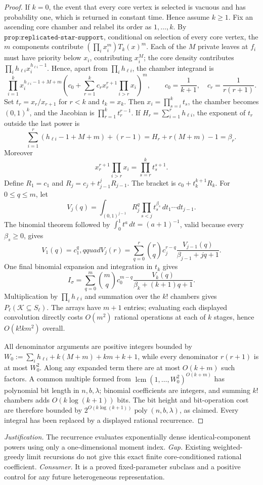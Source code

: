 \documentclass{article}
\begin{document}
\begin{proof}
If \(k=0\), the event that every core vertex is selected is vacuous and has probability one, which is returned in constant time.  Hence assume \(k\ge1\).  Fix an ascending core chamber and relabel its order as \(1,\ldots,k\).  By \(\texttt{prop:replicated-star-support}\), conditional on selection of every core vertex, the \(m\) components contribute \((\prod_i x_i^m)T_k(x)^m\).  Each of the \(M\) private leaves at \(f_i\) must have priority below \(x_i\), contributing \(x_i^M\); the core density contributes \(\prod_i h_{\ell i}x_i^{h_{\ell i}-1}\).  Hence, apart from \(\prod_i h_{\ell i}\), the chamber integrand is
\[
 \prod_{i=1}^kx_i^{h_{\ell i}-1+M+m}
 \left(c_0+\sum_{r=1}^kc_r x_r^{r+1}\prod_{i>r}x_i\right)^m,
 \qquad c_0=\frac1{k+1},\quad c_r=\frac1{r(r+1)}.
\]
Set \(t_r=x_r/x_{r+1}\) for \(r<k\) and \(t_k=x_k\).  Then \(x_i=\prod_{s=i}^kt_s\), the chamber becomes \((0,1)^k\), and the Jacobian is \(\prod_{r=1}^kt_r^{r-1}\).  If \(H_r=\sum_{i=1}^rh_{\ell i}\), the exponent of \(t_r\) outside the last power is
\[
 \sum_{i=1}^r(h_{\ell i}-1+M+m)+(r-1)=H_r+r(M+m)-1=\beta_r.
\]
Moreover
\[
 x_r^{r+1}\prod_{i>r}x_i=\prod_{s=r}^kt_s^{s+1}.
\]
Define \(R_1=c_1\) and \(R_j=c_j+t_{j-1}^jR_{j-1}\).  The bracket is \(c_0+t_k^{k+1}R_k\).  For \(0\le q\le m\), let
\[
 V_j(q)=\int_{(0,1)^{j-1}}R_j^q\prod_{s<j}t_s^{\beta_s}\,dt_1\cdots dt_{j-1}.
\]
The binomial theorem followed by \(\int_0^1t^a\,dt=(a+1)^{-1}\), valid because every \(\beta_s\ge0\), gives
\[
 V_1(q)=c_1^q,qquad
 V_j(r)=\sum_{q=0}^r\binom rq c_j^{r-q}
       \frac{V_{j-1}(q)}{\beta_{j-1}+jq+1}.
\]
One final binomial expansion and integration in \(t_k\) gives
\[
 I_\sigma=\sum_{q=0}^m\binom mq c_0^{m-q}
       \frac{V_k(q)}{\beta_k+(k+1)q+1}.
\]
Multiplication by \(\prod_i h_{\ell i}\) and summation over the \(k!\) chambers gives \(P_\ell(\mathcal K\subseteq S_\ell)\).  The arrays have \(m+1\) entries; evaluating each displayed convolution directly costs \(O(m^2)\) rational operations at each of \(k\) stages, hence \(O(k!km^2)\) overall.

All denominator arguments are positive integers bounded by \(W_0:=\sum_i h_{\ell i}+k(M+m)+km+k+1\), while every denominator \(r(r+1)\) is at most \(W_0^2\).  Along any expanded term there are at most \(O(k+m)\) such factors.  A common multiple formed from \(\operatorname{lcm}(1,\ldots,W_0^2)^{O(k+m)}\) has polynomial bit length in \(n,b,\lambda\); binomial coefficients are integers, and summing \(k!\) chambers adds \(O(k\log(k+1))\) bits.  The bit height and bit-operation cost are therefore bounded by \(2^{O(k\log(k+1))}\operatorname{poly}(n,b,\lambda)\), as claimed.  Every integral has been replaced by a displayed rational recurrence.
\end{proof}
\par\smallskip\noindent \textit{Justification.} The recurrence evaluates exponentially dense identical-component powers using only a one-dimensional moment index. \textit{Gap.} Existing weighted-greedy limit recursions do not give this exact finite core-conditioned rational coefficient. \textit{Consumer.} It is a proved fixed-parameter subclass and a positive control for any future heterogeneous representation.
\end{document}

